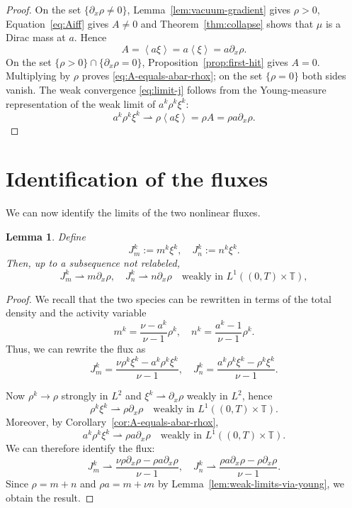 \documentclass[a4paper,twosided,11pt]{article}
\newcommand{\T}{\mathbb{T}}
\newcommand{\av}[1]{\left\langle #1 \right\rangle}
\newcommand{\1}{\mathbf{1}}
\theoremstyle{plain}
\newtheorem{lemma}[thm]{Lemma}
\theoremstyle{remark}
\newcommand{\weakto}{\rightharpoonup}
\numberwithin{equation}{section}
\begin{document}
\begin{proof}
On the set $\{ \partial_x\rho\neq 0\}$, Lemma~\ref{lem:vacuum-gradient} gives $\rho>0$, Equation~\eqref{eq:Aiff} gives $A\ne 0$ and Theorem~\ref{thm:collapse} shows that $\mu$ is a Dirac mass at $a$. Hence
$$
 A=\av{a\xi}=a \av{\xi}=a  \partial_x\rho.
$$
On the set $\{\rho>0\}\cap\{\partial_x\rho=0\}$, Proposition~\ref{prop:first-hit} gives $A=0$. Multiplying by $\rho$ proves \eqref{eq:A-equals-abar-rhox}; on the set $\{\rho=0\}$ both sides vanish. The weak convergence \eqref{eq:limit-j} follows from the Young-measure representation of the weak limit of $a^k\rho^k\xi^k$:
$$
 a^k\rho^k\xi^k \weakto \rho \av{a\xi}=\rho A=\rho a  \partial_x\rho.
$$
\end{proof}

\section{Identification of the fluxes}
\label{sec:existence}

We can now identify the limits of the two nonlinear fluxes.

\begin{lemma}
\label{lem:flux-identification}
Define
$$
 J_m^k:=m^k\xi^k,
 \quad
 J_n^k:=n^k\xi^k.
$$
Then, up to a subsequence not relabeled,
\begin{equation}
\label{eq:flux-m-limit}
 J_m^k \weakto  m  \partial_x\rho,
 \quad   J_n^k \weakto  n  \partial_x\rho\quad \text{weakly in } L^1((0,T)\times\T),
\end{equation}
\end{lemma}

\begin{proof}
We recall that the two species can be rewritten in terms of the total density and the activity variable
$$
 m^k=\frac{\nu-a^k}{\nu-1}\rho^k,
 \quad
 n^k=\frac{a^k-1}{\nu-1}\rho^k.
$$
Thus, we can rewrite the flux as 
\begin{equation}
\label{eq:flux-decomp-m}
 J_m^k
 =\frac{\nu\rho^k\xi^k-a^k\rho^k\xi^k}{\nu-1}, \quad  J_n^k
 =\frac{a^k\rho^k\xi^k-\rho^k\xi^k}{\nu-1}.
\end{equation}

Now $\rho^k\to\rho$ strongly in $L^2$ and $\xi^k\weakto  \partial_x\rho$ weakly in $L^2$, hence
$$
 \rho^k\xi^k \weakto \rho \partial_x\rho
 \quad \text{weakly in } L^1((0,T)\times\T).
$$
Moreover, by Corollary~\ref{cor:A-equals-abar-rhox},
$$
 a^k\rho^k\xi^k \weakto \rho a  \partial_x\rho
 \quad \text{weakly in } L^1((0,T)\times\T).
$$
We can therefore identify the flux: 
$$
 J_m^k \weakto \frac{\nu\rho \partial_x\rho-\rho a  \partial_x\rho}{\nu-1},
 \quad
 J_n^k \weakto \frac{\rho a  \partial_x\rho-\rho \partial_x\rho}{\nu-1}.
$$
Since $\rho= m+n$ and $\rho a= m+\nu n$ by Lemma~\ref{lem:weak-limits-via-young}, we obtain the result.
\end{proof}
\end{document}

